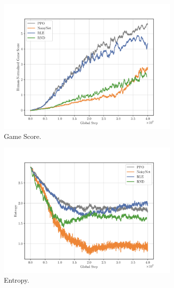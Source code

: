 \begin{figure}[h!]
  \centering
  \begin{subfigure}[b]{0.45\textwidth}
    \centering
    \includegraphics[width=\textwidth]{figures/plot_StarGunner_Score.pdf}
    \caption{Game Score.}
    \label{fig:stargunner-score}
  \end{subfigure}
  \hfill
  \begin{subfigure}[b]{0.45\textwidth}
    \centering
    \includegraphics[width=\textwidth]{figures/plot_StarGunner_Entropy.pdf}
    \caption{Entropy.}
    \label{fig:stargunner-entropy}
  \end{subfigure}
  \begin{subfigure}[b]{0.45\textwidth}
    \centering

\end{subfigure}
\end{figure}
